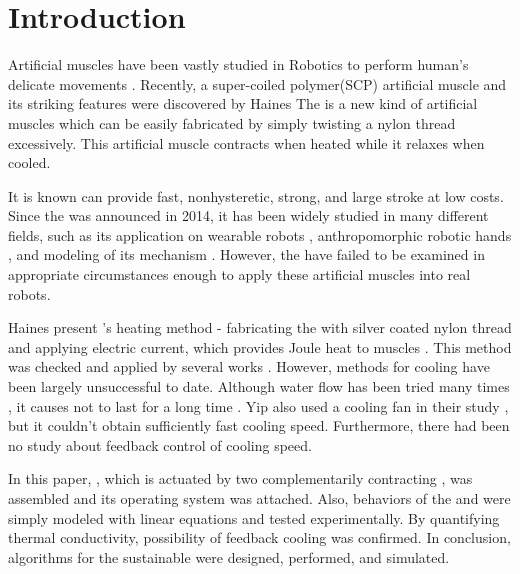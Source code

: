 
\section{Introduction}
Artificial muscles have been vastly studied in Robotics to perform human's delicate movements \cite{ashley}. Recently, a super-coiled polymer(SCP) artificial muscle and its striking features were discovered by Haines \etal \cite{haines} The \scp is a new kind of artificial muscles which can be easily fabricated by simply twisting a nylon thread excessively. This artificial muscle contracts when heated while it relaxes when cooled.

It is known \scps can provide fast, nonhysteretic, strong, and large stroke at low costs\cite{yuan, mirvakili, madden}. 
Since the \scp was announced in 2014, it has been widely studied in many different fields, such as its application on
wearable robots \cite{sphincter, kianzad2}, 
anthropomorphic robotic hands \cite{yip, finger}, 
and modeling of its mechanism \cite{treatise, torsional, youngmodulus, fab_coil, multiscale, healing, kianzad, moretti}. 
However, the \scps have failed to be examined in appropriate circumstances enough to apply these artificial muscles into real robots.

Haines \etalspace present \scpnospace's heating method - fabricating the \scps with silver coated nylon thread and applying electric current, which provides Joule heat to muscles \cite{haines}. This method was checked and applied by several works \cite{yip, mirvakili,kianzad,sphincter,kianzad2}. However, methods for cooling \scps have been largely unsuccessful to date. 
Although water flow has been tried many times \cite{haines,finger},
it causes \scps not to last for a long time \cite{haines}.
Yip \etalspace also used a cooling fan in their study \cite{yip}, but it couldn't obtain sufficiently fast cooling speed.
Furthermore, there had been no study about feedback control of cooling speed.

In this paper, \antanospace, which is actuated by two complementarily contracting \scpsnospace, was assembled and its operating system was attached. Also, behaviors of the \scps and \anta were simply modeled with linear equations and tested experimentally. By quantifying thermal conductivity, possibility of feedback cooling was confirmed. In conclusion, algorithms for the sustainable \apc were designed, performed, and simulated.